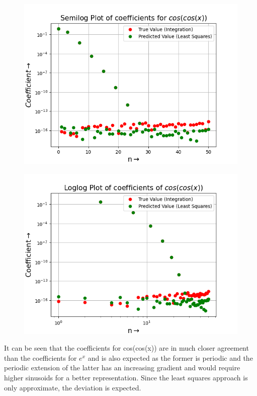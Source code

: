 \documentclass{article}
\begin{document}
\begin{figure}[h!]
    \centering
    \includegraphics[scale=0.55]{q5(c)}
    \label{fig:1(b)}
\end{figure}
\begin{figure}[h!]
    \centering
    \includegraphics[scale=0.55]{q5(d)}
    \label{fig:1(b)}
\end{figure}



It can be seen that the coefficients for cos(cos(x)) are in much closer
agreement than the coefficients for $e^x$ and is also expected as the former is
periodic and the periodic extension of the latter has an increasing gradient
and would require higher sinusoids for a better representation. Since the
least squares approach is only approximate, the deviation is expected.
\end{document}
